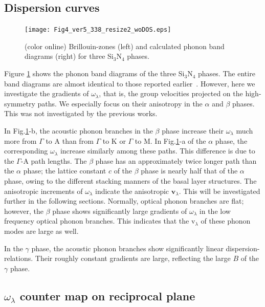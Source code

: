 \documentclass[twocolumn,amsmath,amssymb,a4paper,prb,superscriptaddress,floatfix]{revtex4-1}
\begin{document}
\subsection{Dispersion curves}

\begin{figure}[ht]
 \begin{center}
  \texttt{[image: Fig4\_ver5\_338\_resize2\_woDOS.eps]}
  \caption{(color online) Brillouin-zones (left) and calculated phonon band diagrams (right) for three Si$_3$N$_4$ phases.
  \label{fig:Fig4_ver5_338} }
 \end{center}
\end{figure}

Figure \ref{fig:Fig4_ver5_338} shows the phonon band diagrams of the three
Si$_3$N$_4$ phases. The entire band diagrams are almost identical to those
reported earlier~\cite{kuwabara,xu}. However, here we investigate the gradients
of $\omega_\lambda$, that is, the group velocities projected on the
high-symmetry paths. We especially focus on their anisotropy in the $\alpha$ and
$\beta$ phases. This was not investigated by the previous works.

In Fig.\ref{fig:Fig4_ver5_338}-b, the acoustic phonon branches in the $\beta$
phase increase their $\omega_\lambda$ much more from $\Gamma$ to A than from
$\Gamma$ to K or $\Gamma$ to M. In Fig.\ref{fig:Fig4_ver5_338}-a of the $\alpha$
phase, the corresponding $\omega_\lambda$ increase similarly among these paths.
This difference is due to the $\Gamma$-A path lengths.  The $\beta$ phase has an
approximately twice longer path than the $\alpha$ phase; the lattice constant
$c$ of the $\beta$ phase is nearly half that of the $\alpha$ phase, owing to the
different stacking manners of the basal layer structures.  The anisotropic
increments of $\omega_\lambda$ indicate the anisotropic $\mathbf{v}_\lambda$.
This will be investigated further in the following sections.  Normally, optical
phonon branches are flat; however, the $\beta$ phase shows significantly large
gradients of $\omega_\lambda$ in the low frequency optical phonon branches.
This indicates that the \rm{v}$_{\lambda}$ of these phonon modes are large as
well.

In the $\gamma$ phase, the acoustic phonon branches show significantly linear
dispersion-relations.  Their roughly constant gradients are large, reflecting
the large $B$ of the $\gamma$ phase.

\subsection{$\omega_\lambda$ counter map on reciprocal plane}
\end{document}
